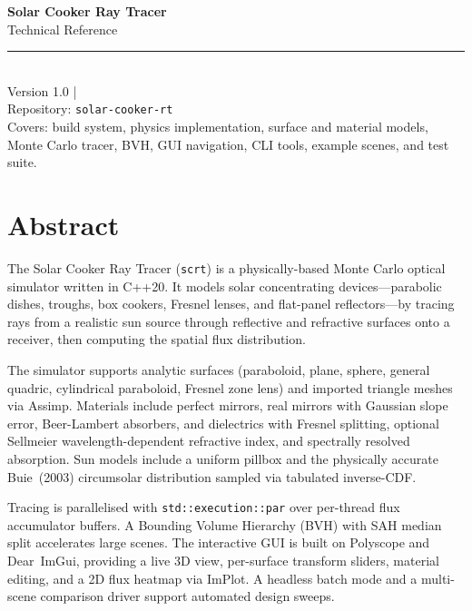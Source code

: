 \documentclass[12pt,a4paper]{report}
\begin{document}
\begin{titlepage}
  \centering
  \vspace*{3cm}
  {\Huge\bfseries Solar Cooker Ray Tracer\\[0.6em]}
  {\Large Technical Reference\\[2em]}
  \rule{0.5\textwidth}{0.6pt}\\[2em]
  {\large Version 1.0 \quad|}\\[1em]
  {\normalsize Repository: \texttt{solar-cooker-rt}}\\[3em]
  \vfill
  {\small
    Covers: build system, physics implementation, surface and material models,\\
    Monte Carlo tracer, BVH, GUI navigation, CLI tools, example scenes, and test suite.
  }
\end{titlepage}

\chapter*{Abstract}

The Solar Cooker Ray Tracer (\texttt{scrt}) is a physically-based Monte Carlo optical
simulator written in C++20.  It models solar concentrating devices—parabolic dishes,
troughs, box cookers, Fresnel lenses, and flat-panel reflectors—by tracing rays from a
realistic sun source through reflective and refractive surfaces onto a receiver, then
computing the spatial flux distribution.

The simulator supports analytic surfaces (paraboloid, plane, sphere, general quadric,
cylindrical paraboloid, Fresnel zone lens) and imported triangle meshes via Assimp.
Materials include perfect mirrors, real mirrors with Gaussian slope error, Beer-Lambert
absorbers, and dielectrics with Fresnel splitting, optional Sellmeier wavelength-dependent
refractive index, and spectrally resolved absorption.  Sun models include a uniform pillbox
and the physically accurate Buie~(2003) circumsolar distribution sampled via tabulated
inverse-CDF.

Tracing is parallelised with \texttt{std::execution::par} over per-thread flux accumulator
buffers.  A Bounding Volume Hierarchy (BVH) with SAH median split accelerates large scenes.
The interactive GUI is built on Polyscope and Dear~ImGui, providing a live 3D view,
per-surface transform sliders, material editing, and a 2D flux heatmap via ImPlot.  A
headless batch mode and a multi-scene comparison driver support automated design sweeps.
\end{document}
